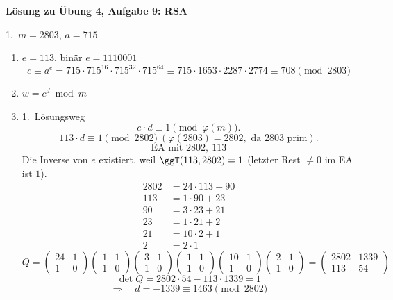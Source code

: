 \textbf{Lösung zu Übung 4, Aufgabe 9: RSA}

\begin{loesung}
1.\ $m = 2803$, $a = 715$
\begin{enumerate}[label=\alph*)]
  \item $e = 113$, binär $e = 1110001$
  \[
  c \equiv a^e = 715 \cdot 715^{16} \cdot 715^{32} \cdot 715^{64} \equiv 715 \cdot 1653 \cdot 2287 \cdot 2774 \equiv 708 \pmod{2803}
  \]
  \item $w = c^d \bmod m$
  \item 1.\ Lösungsweg
  \[
  e \cdot d \equiv 1 \pmod{\varphi(m)}. \]\[ 113 \cdot d \equiv 1 \pmod{2802} \ (\varphi(2803) = 2802, \text{ da } 2803 \text{ prim}). \]\[ \text{EA mit } 2802,\ 113
  \]
  Die Inverse von $e$ existiert, weil $\ggT(113, 2802) = 1$ (letzter Rest $\neq 0$ im EA ist $1$).
  \begin{align*}
  2802 &= 24 \cdot 113 + 90\\
  113 &= 1 \cdot 90 + 23\\
  90 &= 3 \cdot 23 + 21\\
  23 &= 1 \cdot 21 + 2\\
  21 &= 10 \cdot 2 + 1\\
  2 &= 2 \cdot 1
  \end{align*}
  \[
  Q = \begin{pmatrix} 24 & 1\\ 1 & 0 \end{pmatrix}
      \begin{pmatrix} 1 & 1\\ 1 & 0 \end{pmatrix}
      \begin{pmatrix} 3 & 1\\ 1 & 0 \end{pmatrix}
      \begin{pmatrix} 1 & 1\\ 1 & 0 \end{pmatrix}
      \begin{pmatrix} 10 & 1\\ 1 & 0 \end{pmatrix}
      \begin{pmatrix} 2 & 1\\ 1 & 0 \end{pmatrix}
    = \begin{pmatrix} 2802 & 1339\\ 113 & 54 \end{pmatrix}
  \]
  \[
  \det Q = 2802 \cdot 54 - 113 \cdot 1339 = 1
  \]
  \[
  \Rightarrow\quad d = -1339 \equiv 1463 \pmod{2802}
  \]


\end{enumerate}
\end{loesung}
